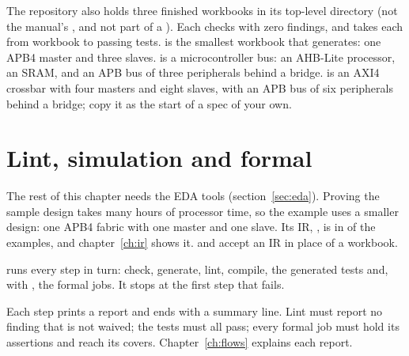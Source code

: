 The repository also holds three finished workbooks in its top-level 
directory (not the manual's , and not part of a ).
Each checks with zero findings, and  takes each from workbook to passing tests.
 is the smallest workbook that generates: one APB4 master and three slaves.
 is a microcontroller bus: an AHB-Lite processor, an SRAM, and an APB bus of
three peripherals behind a  bridge.  is an AXI4 crossbar
with four masters and eight slaves, with an APB bus of six peripherals behind a
 bridge; copy it as the start of a spec of your own.

\section{Lint, simulation and formal}

The rest of this chapter needs the EDA tools (section~\ref{sec:eda}). Proving the
sample design takes many hours of processor time, so the example uses a smaller design:
one APB4 fabric with one master and one slave. Its IR,
, is in  of the examples, and chapter~\ref{ch:ir}
shows it.  and  accept an IR in place of a workbook.

 runs every step in turn: check, generate, lint, compile, the generated
tests and, with , the formal jobs. It stops at the first step that fails.



Each step prints a report and ends with a summary line. Lint must report no finding
that is not waived; the tests must all pass; every formal job must hold its assertions
and reach its covers. Chapter~\ref{ch:flows} explains each report.
